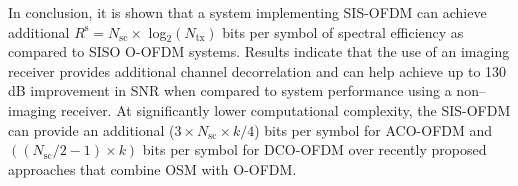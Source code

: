 In conclusion, it is shown that a system implementing SIS-OFDM can achieve additional $R^{\text{s}}=N_{\text{sc}}\times $ log$^{ }_{2}(N_{\text{tx}})$ bits per symbol of spectral efficiency as compared to SISO O-OFDM systems. Results indicate that the use of an imaging receiver provides additional channel decorrelation and can help achieve up to 130 dB improvement in SNR when compared to system performance using a non--imaging receiver. At significantly lower computational complexity, the SIS-OFDM can provide an additional ($3\times N_{\text{sc}}\times k/4$) bits per symbol for ACO-OFDM and $((N_{\text{sc}}/2 -1)\times k)$ bits per symbol for DCO-OFDM over recently proposed approaches that combine OSM with O-OFDM.
